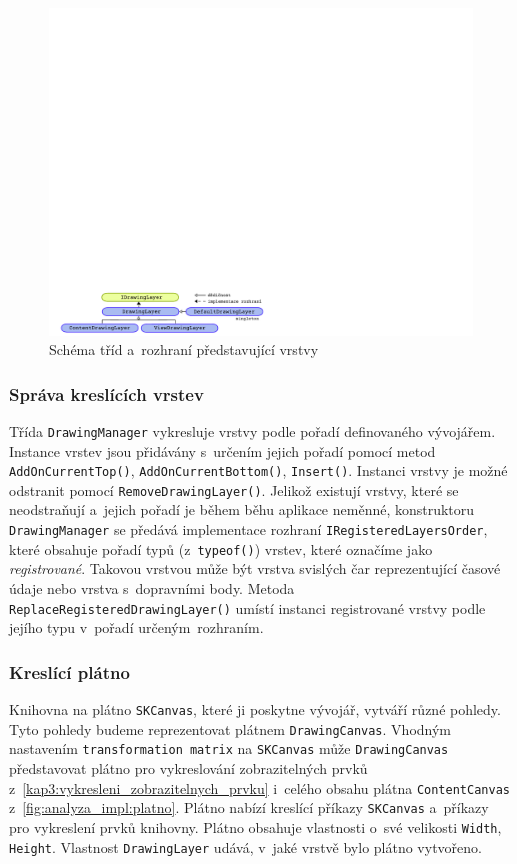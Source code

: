 \begin{figure}[!hbt]
	\centering
	\includegraphics[width=\textwidth]{../img/kap4_gttg-core_drawing_layers1}
	\caption{Schéma tříd a~rozhraní představující vrstvy}
	\label{fig:kap4:drawing_layers_diagram}
\end{figure}

\subsubsection*{Správa kreslících vrstev}
Třída \texttt{DrawingManager} vykresluje vrstvy podle pořadí definovaného vývojářem. Instance vrstev jsou přidávány s~určením jejich pořadí pomocí metod \texttt{AddOnCurrentTop()}, \texttt{AddOnCurrentBottom()}, \texttt{Insert()}. Instanci vrstvy je \linebreak možné odstranit pomocí \texttt{RemoveDrawingLayer()}. Jelikož existují vrstvy, které se neodstraňují a~jejich pořadí je během běhu aplikace neměnné, konstruktoru \texttt{DrawingManager} se předává implementace rozhraní \texttt{IRegisteredLayersOrder}, které obsahuje pořadí typů (z~\texttt{typeof()}) vrstev, které označíme jako \textit{registrované}. Takovou vrstvou může být vrstva svislých čar reprezentující časové údaje nebo vrstva s~dopravními body. Metoda \texttt{ReplaceRegisteredDrawingLayer()} umístí instanci registrované vrstvy podle jejího  typu v~pořadí určeným~rozhraním.

\subsubsection*{Kreslící plátno}
Knihovna na plátno \texttt{SKCanvas}, které ji poskytne vývojář, vytváří různé pohledy. Tyto pohledy budeme reprezentovat plátnem \texttt{DrawingCanvas}. Vhodným nastavením \texttt{transformation matrix} na \texttt{SKCanvas} může \texttt{DrawingCanvas} představovat plátno pro vykreslování zobrazitelných prvků z~\ref{kap3:vykresleni_zobrazitelnych_prvku} i~celého obsahu plátna \texttt{ContentCanvas} z~\ref{fig:analyza_impl:platno}. Plátno nabízí kreslící příkazy \texttt{SKCanvas} a~příkazy pro vykreslení prvků knihovny. Plátno obsahuje vlastnosti o~své velikosti \texttt{Width}, \texttt{Height}. Vlastnost \texttt{DrawingLayer} udává, v~jaké vrstvě bylo plátno vytvořeno.

